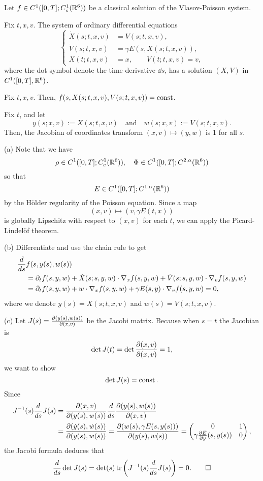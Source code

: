 \documentclass[12pt]{article}
\begin{document}
\begin{lem}
Let $f\in C^1([0,T];C_c^1(\mathbb{R}^6))$ be a classical solution of the Vlasov-Poisson system.
\begin{parts}
\item Fix $t,x,v$. The system of ordinary differential equations
\[\left\{\begin{aligned}
\dot X(s;t,x,v)&=V(s;t,x,v),\\
\dot V(s;t,x,v)&=\gamma E(s,X(s;t,x,v)),\\
X(t;t,x,v)&=x,\qquad V(t;t,x,v)=v,
\end{aligned}\right.\]
where the dot symbol denote the time derivative $\dd{s}$, has a solution $(X,V)$ in $C^1([0,T],\mathbb{R}^6)$.
\item Fix $t,x,v$. Then, $f(s,X(s;t,x,v),V(s;t,x,v))=\operatorname{const}$.
\item Fix $t$, and let
\[y(s;x,v):=X(s;t,x,v)\quad\text{and}\quad w(s;x,v):=V(s;t,x,v).\]
Then, the Jacobian of coordinates transform $(x,v)\mapsto(y,w)$ is 1 for all $s$.
\end{parts}
\end{lem}
\begin{pf}
(a)
Note that we have
\[\rho\in C^1([0,T];C_c^1(\mathbb{R}^6)),\quad\Phi\in C^1([0,T];C^{2,\alpha}(\mathbb{R}^6))\]
so that
\[E\in C^1([0,T];C^{1,\alpha}(\mathbb{R}^6))\]
by the H\"older regularity of the Poisson equation.
Since a map
\[(x,v)\mapsto(v,\gamma E(t,x))\]
is globally Lipschitz with respect to $(x,v)$ for each $t$, we can apply the Picard-Lindel\"of theorem.

(b)
Differentiate and use the chain rule to get
\begin{align*}
\dd{s}&f(s,y(s),w(s))\\
&=\pd_tf(s,y,w)+\dot X(s;s,y,w)\cdot\nabla_xf(s,y,w)+\dot V(s;s,y,w)\cdot\nabla_vf(s,y,w)\\
&=\pd_tf(s,y,w)+w\cdot\nabla_xf(s,y,w)+\gamma E(s,y)\cdot\nabla_vf(s,y,w)=0,
\end{align*}
where we denote $y(s)=X(s;t,x,v)$ and $w(s)=V(s;t,x,v)$.

(c)
Let $J(s)=\pd{(y(s),w(s))}{(x,v)}$ be the Jacobi matrix.
Because when $s=t$ the Jacobian is
\[\det J(t)=\det\pd{(x,v)}{(x,v)}=1,\]
we want to show
\[\det J(s)=\operatorname{const}.\]
Since
\begin{align*}
J^{-1}(s)\dd{s}J(s)
&=\pd{(x,v)}{(y(s),w(s))}\dd{s}\pd{(y(s),w(s))}{(x,v)}\\
&=\pd{(\dot y(s),\dot w(s))}{(y(s),w(s))}
=\pd{(w(s),\gamma E(s,y(s)))}{(y(s),w(s))}
=\mat{0&1\\\gamma\pd{E}{y}(s,y(s))&0},
\end{align*}
the Jacobi formula deduces that
\[\dd{s}\det J(s)=\det(s)\tr\left(J^{-1}(s)\dd{s}J(s)\right)=0.\qedhere\]
\end{pf}
\end{document}
